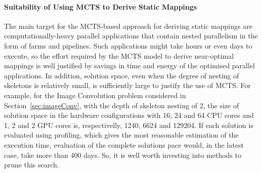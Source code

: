 \documentclass[smallextended]{svjour3}
\begin{document}
\paragraph{Suitability of Using MCTS to Derive Static Mappings} The main target for the MCTS-based approach for deriving static mappings are computationally-heavy parallel applications that contain nested parallelism in the form of farms and pipelines. Such applications might take hours or even days to execute, so the effort required by the MCTS model to derive near-optimal mappings is well justified by savings in time and energy of the optimised parallel applications. In addition, solution space, even when the degree of nesting of skeletons is relatively small, is sufficiently large to justify the use of MCTS. For example, for the Image Convolution problem considered in Section~\ref{sec:imageConv}, with the depth of skeleton nesting of 2, the size of solution space in the hardware configurations with 16, 24 and 64 CPU cores and 1, 2 and 2 GPU cores is, respectivelly, 1240, 6624 and 129204. If each solution is evaluated using profiling, which gives the most reasonable estimation of the execution time, evaluation of the complete solutions pace would, in the latest case, take more than 400 days. So, it is well worth investing into methods to prune this search.






\end{document}
